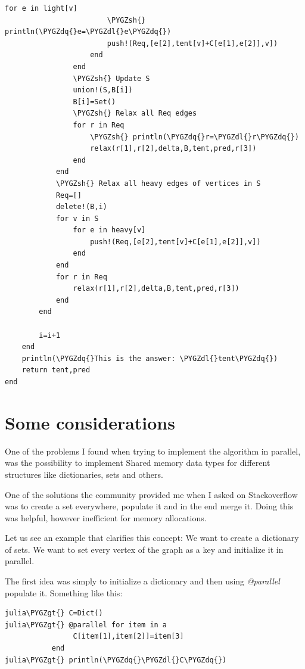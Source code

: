 \documentclass[letterpaper,10pt,english]{sphinxmanual}
\def\PYGZgt{\char`\>}
\def\PYGZsh{\char`\#}
\def\PYGZdl{\char`\$}
\def\PYGZdq{\char`\"}
\begin{document}
\begin{Verbatim}[commandchars=\\\{\}]
                    for e in light[v]
                        \PYGZsh{} println(\PYGZdq{}e=\PYGZdl{}e\PYGZdq{})
                        push!(Req,[e[2],tent[v]+C[e[1],e[2]],v])
                    end
                end
                \PYGZsh{} Update S
                union!(S,B[i])
                B[i]=Set()
                \PYGZsh{} Relax all Req edges
                for r in Req
                    \PYGZsh{} println(\PYGZdq{}r=\PYGZdl{}r\PYGZdq{})
                    relax(r[1],r[2],delta,B,tent,pred,r[3])
                end
            end
            \PYGZsh{} Relax all heavy edges of vertices in S
            Req=[]
            delete!(B,i)
            for v in S
                for e in heavy[v]
                    push!(Req,[e[2],tent[v]+C[e[1],e[2]],v])
                end
            end
            for r in Req
                relax(r[1],r[2],delta,B,tent,pred,r[3])
            end
        end

        i=i+1
    end
    println(\PYGZdq{}This is the answer: \PYGZdl{}tent\PYGZdq{})
    return tent,pred
end
\end{Verbatim}


\section{Some considerations}
\label{Algorithm:some-considerations}
One of the problems I found when trying to implement the algorithm in parallel, was the possibility to implement Shared memory data types for different structures like dictionaries, sets and others.

One of the solutions the community provided me when I asked on Stackoverflow was to create a set everywhere, populate it and in the end merge it. Doing this was helpful, however inefficient for memory allocations.

Let us see an example that clarifies this concept: We want to create a dictionary of sets. We want to set every vertex of the graph as a key and initialize it in parallel.

The first idea was simply to initialize a dictionary and then using \emph{@parallel}
populate it. Something like this:

\begin{Verbatim}[commandchars=\\\{\}]
julia\PYGZgt{} C=Dict()
julia\PYGZgt{} @parallel for item in a
                C[item[1],item[2]]=item[3]
           end
julia\PYGZgt{} println(\PYGZdq{}\PYGZdl{}C\PYGZdq{})
\end{Verbatim}
\end{document}
